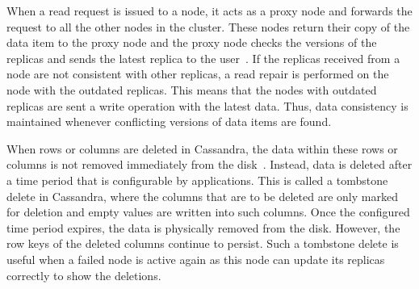 		

When a read request is issued to a node,  it acts as a proxy node and forwards
the request to all the other nodes in the cluster.
These nodes return their copy of the data item to the proxy node and the proxy
node  checks the versions of the replicas and sends the latest replica to the
user~\citep{datastaxRead}.   If the replicas received from a node are not
consistent with other replicas, a read repair is performed on the node
with the outdated replicas.  This means that the nodes with outdated replicas
are sent a write operation with the latest data.
Thus,  data consistency is maintained whenever conflicting versions of data
items are found.

When rows or columns are deleted in Cassandra, the  data within these rows or
columns is not removed immediately from the disk~\citep{datastax,BOOK}. Instead,
data is deleted after a time period that is configurable by applications. This
is called a tombstone delete in Cassandra, where the columns that are to
be deleted are only marked for deletion and empty values are written into such
columns.
Once the configured time period expires, the data is physically removed from the
disk. However, the row keys of the deleted columns continue to persist. Such a
tombstone delete is useful when a failed node is active again as this node can
update its replicas  correctly to show the deletions.

